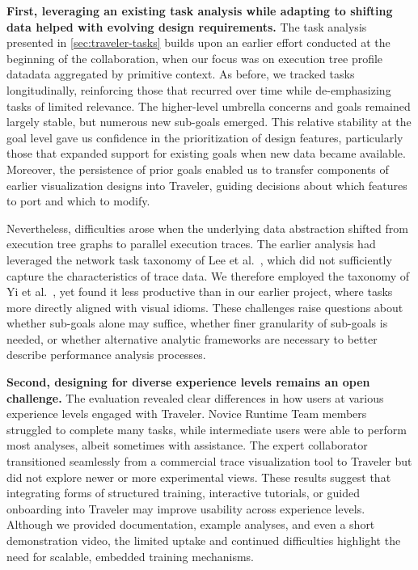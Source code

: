 \begin{refsection}
\textbf{First, leveraging an existing task analysis while adapting to shifting data helped with evolving design requirements.} The task analysis presented in \autoref{sec:traveler-tasks} builds upon an earlier effort conducted at the beginning of the collaboration, when our focus was on execution tree profile data\textemdash data aggregated by primitive context. As before, we tracked tasks longitudinally, reinforcing those that recurred over time while de-emphasizing tasks of limited relevance. The higher-level umbrella concerns and goals remained largely stable, but numerous new sub-goals emerged. This relative stability at the goal level gave us confidence in the prioritization of design features, particularly those that expanded support for existing goals when new data became available. Moreover, the persistence of prior goals enabled us to transfer components of earlier visualization designs into Traveler, guiding decisions about which features to port and which to modify.  

Nevertheless, difficulties arose when the underlying data abstraction shifted from execution tree graphs to parallel execution traces. The earlier analysis had leveraged the network task taxonomy of Lee et al.~\cite{Lee2006}, which did not sufficiently capture the characteristics of trace data. We therefore employed the taxonomy of Yi et al.~\cite{Yi2007}, yet found it less productive than in our earlier project, where tasks more directly aligned with visual idioms. These challenges raise questions about whether sub-goals alone may suffice, whether finer granularity of sub-goals is needed, or whether alternative analytic frameworks are necessary to better describe performance analysis processes.

\textbf{Second, designing for diverse experience levels remains an open challenge.} The evaluation revealed clear differences in how users at various experience levels engaged with Traveler. Novice Runtime Team members struggled to complete many tasks, while intermediate users were able to perform most analyses, albeit sometimes with assistance. The expert collaborator transitioned seamlessly from a commercial trace visualization tool to Traveler but did not explore newer or more experimental views. These results suggest that integrating forms of structured training, interactive tutorials, or guided onboarding into Traveler may improve usability across experience levels. Although we provided documentation, example analyses, and even a short demonstration video, the limited uptake and continued difficulties highlight the need for scalable, embedded training mechanisms.


\end{refsection}

